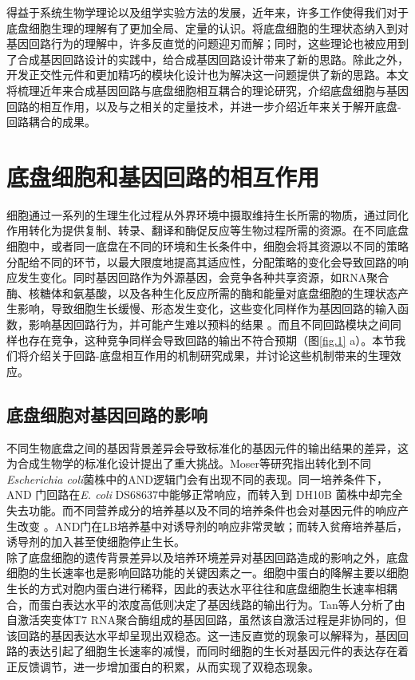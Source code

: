 \documentclass[b5paper,9pt,oneolumn,twoside,UTF8]{article}
\begin{document}
\indent 得益于系统生物学理论以及组学实验方法的发展，近年来，许多工作使得我们对于底盘细胞生理的理解有了更加全局、定量的认识\cite{hui2015, Gorochowski2017, Erickson2017}。将底盘细胞的生理状态纳入到对基因回路行为的理解中，许多反直觉的问题迎刃而解\cite{Boada2018}；同时，这些理论也被应用到了合成基因回路设计的实践中，给合成基因回路设计带来了新的思路。除此之外，开发正交性元件和更加精巧的模块化设计也为解决这一问题提供了新的思路\cite{10.1016/j.copbio.2019.11.015}。本文将梳理近年来合成基因回路与底盘细胞相互耦合的理论研究，介绍底盘细胞与基因回路的相互作用，以及与之相关的定量技术，并进一步介绍近年来关于解开底盘-回路耦合的成果。 
\section{底盘细胞和基因回路的相互作用}
细胞通过一系列的生理生化过程从外界环境中摄取维持生长所需的物质，通过同化作用转化为提供复制、转录、翻译和酶促反应等生物过程所需的资源。在不同底盘细胞中，或者同一底盘在不同的环境和生长条件中，细胞会将其资源以不同的策略分配给不同的环节，以最大限度地提高其适应性\cite{Scott2010, you2013, hui2015, Zheng2020}，分配策略的变化会导致回路的响应发生变化。同时基因回路作为外源基因，会竞争各种共享资源，如RNA聚合酶、核糖体和氨基酸，以及各种生化反应所需的酶和能量\cite{Borkowski2016, Towbin2017, 10.1038/msb.2012.70}对底盘细胞的生理状态产生影响，导致细胞生长缓慢、形态发生变化，这些变化同样作为基因回路的输入函数，影响基因回路行为，并可能产生难以预料的结果 \cite{10.1016/j.bpj.2017.12.010}。而且不同回路模块之间同样也存在竞争，这种竞争同样会导致回路的输出不符合预期（图\ref{fig.1} a）。本节我们将介绍关于回路-底盘相互作用的机制研究成果，并讨论这些机制带来的生理效应。
\subsection{底盘细胞对基因回路的影响}
\indent 不同生物底盘之间的基因背景差异会导致标准化的基因元件的输出结果的差异\cite{cardinale2013effects,vilanova2015standards}，这为合成生物学的标准化设计提出了重大挑战。Moser等研究指出转化到不同\emph{Escherichia coli}菌株中的AND逻辑门会有出现不同的表现\cite{moser2012genetic}。同一培养条件下，AND 门回路在\emph{E. coli} DS68637中能够正常响应，而转入到 DH10B 菌株中却完全失去功能。而不同营养成分的培养基以及不同的培养条件也会对基因元件的响应产生改变 \cite{Liu2018a, 10.1038/s41586-020-2505-4, 10.15252/msb.20167402}。AND门在LB培养基中对诱导剂的响应非常灵敏；而转入贫瘠培养基后，诱导剂的加入甚至使细胞停止生长。\\
\indent 除了底盘细胞的遗传背景差异以及培养环境差异对基因回路造成的影响之外，底盘细胞的生长速率也是影响回路功能的关键因素之一。细胞中蛋白的降解主要以细胞生长的方式对胞内蛋白进行稀释\cite{Hintsche2013}，因此的表达水平往往和底盘细胞生长速率相耦合，而蛋白表达水平的浓度高低则决定了基因线路的输出行为\cite{Bintu2005}。Tan等人分析了由自激活突变体T7 RNA聚合酶组成的基因回路，虽然该自激活过程是非协同的，但该回路的基因表达水平却呈现出双稳态。这一违反直觉的现象可以解释为，基因回路的表达引起了细胞生长速率的减慢，而同时细胞的生长对基因元件的表达存在着正反馈调节，进一步增加蛋白的积累，从而实现了双稳态现象\cite{Tan2009}。
\end{document}
